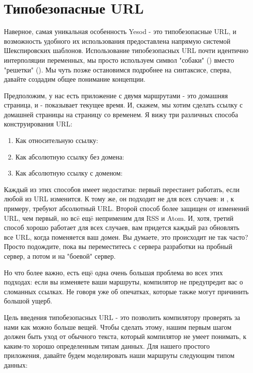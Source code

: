 \section{Типобезопасные URL}
Наверное, самая уникальная особенность Yesod - это типобезопасные URL, и 
возможность удобного их использования предоставлена напрямую системой 
Шекспировских шаблонов.
Использование типобезопасных URL почти идентично интерполяции переменных,
мы просто используем символ "собаки" () вместо "решетки" (\textt{#}).
Мы чуть позже остановимся подробнее на синтаксисе, сперва, давайте создадим
общее понимание концепции.

Предположим, у нас есть приложение с двумя маршрутами 
 - это домашняя страница, и 
 - показывает текущее время.
И, скажем, мы хотим сделать ссылку с домашней страницы на страницу со временем.
Я вижу три различных способа конструирования URL:
\begin{enumerate}
  \item Как относительную ссылку: 
  \item Как абсолютную ссылку без домена: 
  \item Как абсолютную ссылку с доменом: 
\end{enumerate}

Каждый из этих способов имеет недостатки: первый перестанет работать, если 
любой из URL изменится. К тому же, он подходит не для всех случаев: 
 и , к примеру, требуют абсолютный URL. Второй способ
более защищен от изменений URL, чем первый, но всë ещë неприменим для RSS и Atom.
И, хотя, третий способ хорошо работает для всех случаев, вам придется каждый раз
обновлять все URL, когда поменяется ваш домен. Вы думаете, это происходит не так
часто? Просто подождите, пока вы переместитесь с сервера разработки на пробный
сервер, а потом и на "боевой" сервер.

Но что более важно, есть ещë одна очень большая проблема во всех этих подходах:
если вы изменяете ваши маршруты, компилятор не предупредит вас о сломанных
ссылках. Не говоря уже об опечатках, которые также могут причинить большой ущерб.

Цель введения типобезопасных URL - это позволить компилятору проверять за 
нами как можно больше вещей. Чтобы сделать этому, нашим первым шагом 
должен быть уход от обычного текста, который компилятор не умеет понимать, 
к каким-то хорошо определенным типам данных. Для нашего простого приложения,
давайте будем моделировать наши маршруты следующим типом данных:

